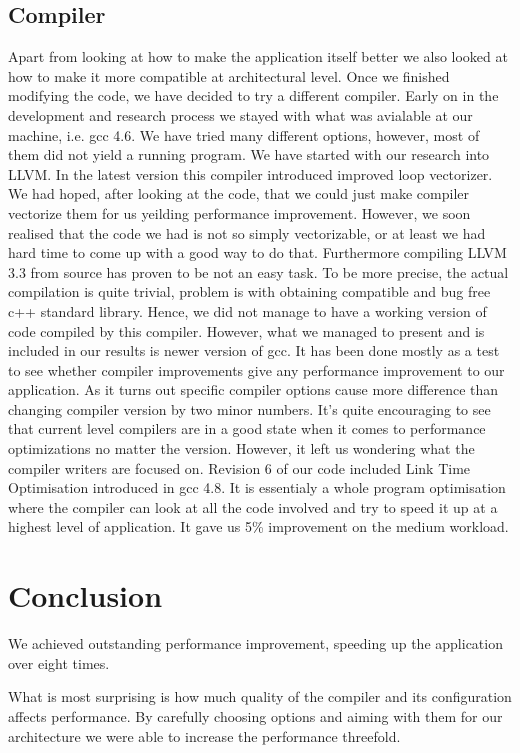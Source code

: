 \documentclass[conference]{IEEEtran}
\begin{document}
\subsection{Compiler}
Apart from looking at how to make the application itself better we also looked at how to make it more compatible at architectural level. Once we finished modifying the code, we have decided to try a different compiler. Early on in the development and research process we stayed with what was avialable at our machine, i.e. gcc 4.6. We have tried many different options, however, most of them did not yield a running program. We have started with our research into LLVM. In the latest version this compiler introduced improved loop vectorizer. We had hoped, after looking at the code, that we could just make compiler vectorize them for us yeilding performance improvement.
However, we soon realised that the code we had is not so simply vectorizable, or at least we had hard time to come up with a good way to do that. Furthermore compiling LLVM 3.3 from source has proven to be not an easy task. To be more precise, the actual compilation is quite trivial, problem is with obtaining compatible and bug free c++ standard library. Hence, we did not manage to have a working version of code compiled by this compiler. However, what we managed to present and is included in our results is newer version of gcc. It has been done mostly as a test to see whether compiler improvements give any performance improvement to our application.
As it turns out specific compiler options cause more difference than changing compiler version by two minor numbers. It's quite encouraging to see that current level compilers are in a good state when it comes to performance optimizations no matter the version. However, it left us wondering what the compiler writers are focused on. Revision 6 of our code included Link Time Optimisation introduced in gcc 4.8. It is essentialy a whole program optimisation where the compiler can look at all the code involved and try to speed it up at a highest level of application. It gave us 5\% improvement on the medium workload.

\section{Conclusion}
We achieved outstanding performance improvement, speeding up the application over eight times.

What is most surprising is how much quality of the compiler and its configuration affects performance. By carefully choosing options and aiming with them for our architecture we were able to increase the performance threefold.
\end{document}
